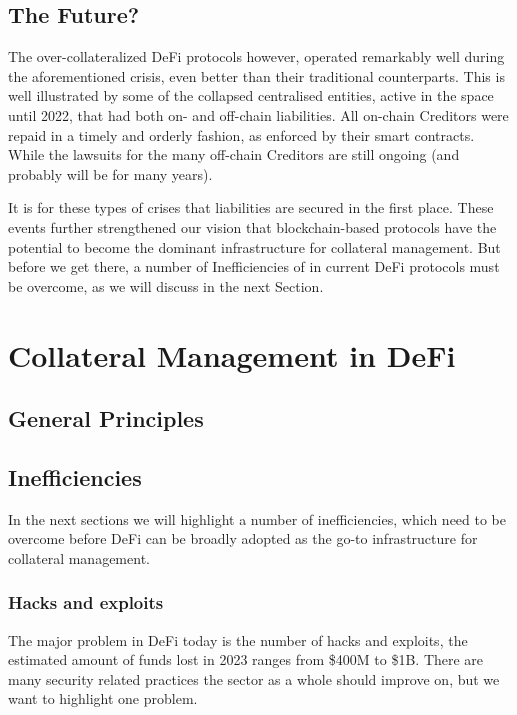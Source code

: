 \documentclass[sigconf,nonacm]{acmart}
\begin{document}
\subsection{The Future?}
The over-collateralized DeFi protocols however, operated remarkably well during the aforementioned crisis, even better than their traditional counterparts.
This is well illustrated by some of the collapsed centralised entities, active in the space until 2022, that had both on- and off-chain liabilities.
All on-chain Creditors were repaid in a timely and orderly fashion, as enforced by their smart contracts.
While the lawsuits for the many off-chain Creditors are still ongoing (and probably will be for many years).

It is for these types of crises that liabilities are secured in the first place.
These events further strengthened our vision that blockchain-based protocols have the potential to become the dominant infrastructure for collateral management.
But before we get there, a number of Inefficiencies of in current DeFi protocols must be overcome, as we will discuss in the next Section.

\section{Collateral Management in DeFi}
\subsection{General Principles}

\subsection{Inefficiencies}

In the next sections we will highlight a number of inefficiencies,
which need to be overcome before DeFi can be broadly adopted as the go-to infrastructure for collateral management.

\subsubsection{Hacks and exploits}
\label{subsubsec:hacks-and-exploits}

The major problem in DeFi today is the number of hacks and exploits, the estimated amount of funds lost in 2023 ranges from \$400M to \$1B.
There are many security related practices the sector as a whole should improve on, but we want to highlight one problem.
\end{document}
